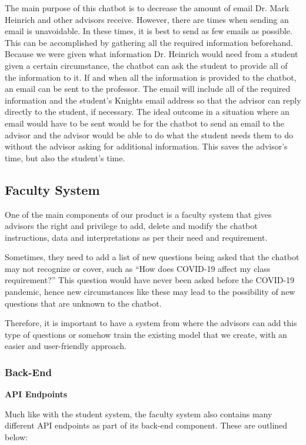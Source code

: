\documentclass[titlepage, 12pt]{article}
\begin{document}
The main purpose of this chatbot is to decrease the amount of email Dr. Mark Heinrich and other advisors receive. However, there are times when sending an email is unavoidable. In these times, it is best to send as few emails as possible. This can be accomplished by gathering all the required information beforehand. Because we were given what information Dr. Heinrich would need from a student given a certain circumstance, the chatbot can ask the student to provide all of the information to it. If and when all the information is provided to the chatbot, an email can be sent to the professor. The email will include all of the required information and the student’s Knights email address so that the advisor can reply directly to the student, if necessary. The ideal outcome in a situation where an email would have to be sent would be for the chatbot to send an email to the advisor and the advisor would be able to do what the student needs them to do without the advisor asking for additional information. This saves the advisor’s time, but also the student’s time.

\subsection{Faculty System}

One of the main components of our product is a faculty system that gives advisors the right and privilege to add, delete and modify the chatbot instructions, data and interpretations as per their need and requirement. 

Sometimes, they need to add a list of new questions being asked that the chatbot may not recognize or cover, such as “How does COVID-19 affect my class requirement?” This question would have never been asked before the COVID-19 pandemic, hence new circumstances like these may lead to the possibility of new questions that are unknown to the chatbot.

Therefore, it is important to have a system from where the advisors can add this type of questions or somehow train the existing model that we create, with an easier and user-friendly approach.

\subsubsection{Back-End}

\textbf{API Endpoints}

Much like with the student system, the faculty system also contains many different API endpoints as part of its back-end component. These are outlined below:
\end{document}
